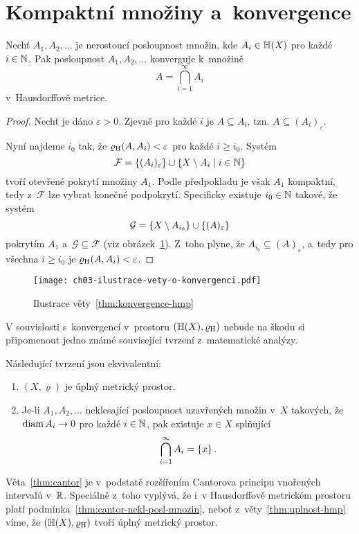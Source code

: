 \section{Kompaktní množiny a~konvergence}\label{sec:konvergence-hmp}

\begin{theorem}\label{thm:konvergence-hmp}
    Nechť $A_1,A_2,\ldots$ je nerostoucí posloupnost množin, kde $A_i\in\mathbb{H}(X)$ pro každé $i\in\mathbb{N}$. Pak posloupnost $A_1,A_2,\ldots$ konverguje k~množině
    \[A=\bigcap_{i=1}^\infty A_i\]
    v~Hausdorffově metrice.
\end{theorem}
\begin{proof}
    Nechť je dáno $\varepsilon>0$. Zjevně pro každé $i$ je $A\subseteq A_i$, tzn. $A\subseteq(A_i)_\varepsilon$.
    
    Nyní najdeme $i_0$ tak, že $\varrho_\textup{H}(A,A_i)<\varepsilon$ pro každé $i\geqslant i_0$. Systém
    \[\mathcal{F}=\left\{(A_i)_\varepsilon\right\}\cup\left\{X\setminus A_i\mid i\in\mathbb{N}\right\}\]
    tvoří otevřené pokrytí množiny $A_1$. Podle předpokladu je však $A_1$ kompaktní, tedy z~$\mathcal{F}$ lze vybrat konečné podpokrytí. Specificky existuje $i_0\in\mathbb{N}$ takové, že systém
    \[\mathcal{G}=\left\{X\setminus A_{i_0}\right\}\cup\left\{(A)_\varepsilon\right\}\]
    pokrytím $A_1$ a~$\mathcal{G}\subseteq\mathcal{F}$ (viz obrázek~\ref{fig:konvergence-hmp}). Z~toho plyne, že $A_{i_0}\subseteq (A)_\varepsilon$, a~tedy pro všechna $i\geqslant i_0$ je $\varrho_\textup{H}(A,A_i)<\varepsilon$.
\end{proof}
\begin{figure}[h]
    \centering
    \texttt{[image: ch03-ilustrace-vety-o-konvergenci.pdf]}
    \caption{Ilustrace věty~\ref{thm:konvergence-hmp}}
    \label{fig:konvergence-hmp}
\end{figure}

V souvislosti s~konvergencí v~prostoru $(\mathbb{H}(X),\varrho_\textup{H})$ nebude na škodu si připomenout jedno známé související tvrzení z~matematické analýzy.
\begin{theorem}\label{thm:cantor}
    Následující tvrzení jsou ekvivalentní:
    \begin{enumerate}[label=(\roman*)]
        \item\label{thm:cantor-uplnost} $(X,\varrho)$ je úplný metrický prostor.
        \item\label{thm:cantor-nekl-posl-mnozin} Je-li $A_1,A_2,\ldots$ neklesající posloupnost uzavřených množin v~$X$ takových, že $\operatorname{diam}{A_i}\to 0$ pro každé $i\in\mathbb{N}$, pak existuje $x\in X$ splňující
        \[\bigcap_{i=1}^\infty A_i=\left\{x\right\}.\]
    \end{enumerate}
\end{theorem}
Věta~\ref{thm:cantor} je v~podstatě rozšířením Cantorova principu vnořených intervalů v~$\mathbb{R}$. Speciálně z~toho vyplývá, že i~v Hausdorffově metrickém prostoru platí podmínka~\ref{thm:cantor-nekl-posl-mnozin}, neboť z~věty~\ref{thm:uplnost-hmp} víme, že $(\mathbb{H}(X),\varrho_\textup{H})$ tvoří úplný metrický prostor.

